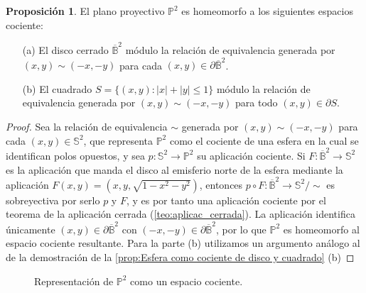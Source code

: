 \documentclass[10pt]{report}
\theoremstyle{definition}
\newtheorem{prop}[defin]{Proposición}
\begin{document}
\begin{prop}%
\label{prop:proyectivo_cociente_cuadrado}
El plano proyectivo $\mathbb{P}^2$ es homeomorfo a los siguientes espacios cociente:
\begin{itemize}
\item[(a)] El disco cerrado $\overline{\mathbb{B}}^2$ módulo la relación de equivalencia generada por $(x,y) \sim (-x,-y)$ para cada $(x,y)\in \partial \overline{\mathbb{B}}^2$.
\item[(b)] El cuadrado $S=\{(x,y):|x|+|y|\leq 1\} $ módulo la relación de equivalencia generada por $(x,y)\sim (-x,-y) $ para todo $(x,y)\in \partial S$.
\end{itemize}
\end{prop}
\begin{proof}
Sea la relación de equivalencia $\sim$ generada por $(x,y) \sim (-x,-y)$ para cada $(x,y)\in \mathbb{S}^2$, que representa $\mathbb{P}^2$ como el cociente de una esfera en la cual se identifican polos opuestos, y sea $p:\mathbb{S}^2 \to \mathbb{P}^2$ su aplicación cociente. %
Si $F:\overline{\mathbb{B}}^2 \to \mathbb{S}^2$ es la aplicación que manda el disco al emisferio norte de la esfera mediante la aplicación $F(x,y)=(x,y,\sqrt{1-x^2-y^2})$, entonces $p\circ F:\overline{\mathbb{B}}^2 \to \mathbb{S}^2/\sim$ es sobreyectiva por serlo $p$ y $F$, y es por tanto una aplicación cociente por el teorema de la aplicación cerrada (\autoref{teo:aplicac_cerrada}). La aplicación identifica únicamente $(x,y)\in \partial \overline{\mathbb{B}}^2$ con $(-x,-y)\in \partial \overline{\mathbb{B}}^2$, por lo que $\mathbb{P}^2$ es homeomorfo al espacio cociente resultante.
Para la parte (b) utilizamos un argumento análogo al de la demostración de la \autoref{prop:Esfera como cociente de disco y cuadrado} (b) 
\end{proof}


\begin{figure}[h]%
\begin{center}
\caption{Representación de $\mathbb{P}^2$ como un espacio cociente.\label{fig:plano_proyectivo_cuadrado}}
\end{center}
\end{figure}
\end{document}
